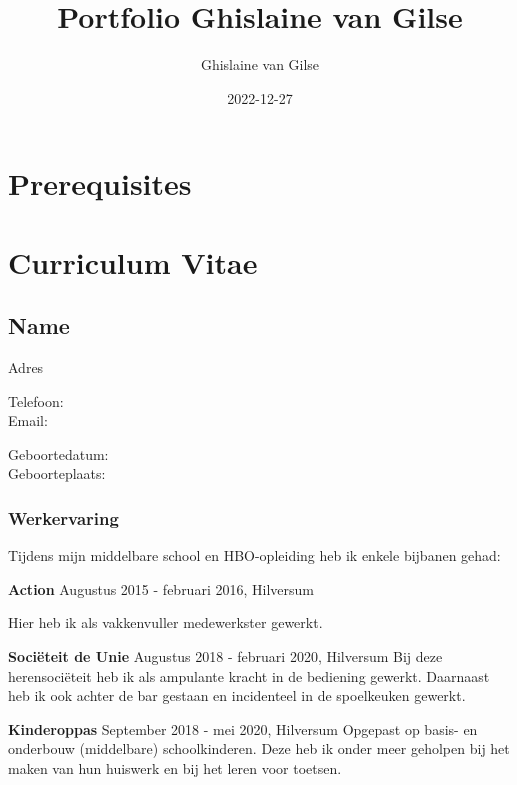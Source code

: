 \documentclass[
]{book}
\title{Portfolio Ghislaine van Gilse}
\author{Ghislaine van Gilse}
\date{2022-12-27}
\begin{document}
\maketitle

{
\setcounter{tocdepth}{1}
\tableofcontents
}
\hypertarget{prerequisites}{%
\chapter*{Prerequisites}\label{prerequisites}}

\hypertarget{curriculum-vitae}{%
\chapter*{Curriculum Vitae}\label{curriculum-vitae}}

\hypertarget{name}{%
\section*{Name}\label{name}}

Adres

Telefoon:\\
Email:

Geboortedatum:\\
Geboorteplaats:\\

\hypertarget{werkervaring}{%
\subsection*{Werkervaring}\label{werkervaring}}

Tijdens mijn middelbare school en HBO-opleiding heb ik enkele bijbanen gehad:

\textbf{Action}
Augustus 2015 - februari 2016, Hilversum

Hier heb ik als vakkenvuller medewerkster gewerkt.

\textbf{Sociëteit de Unie}
Augustus 2018 - februari 2020, Hilversum
Bij deze herensociëteit heb ik als ampulante kracht in de bediening gewerkt. Daarnaast heb ik ook achter de bar gestaan en incidenteel in de spoelkeuken gewerkt.

\textbf{Kinderoppas}
September 2018 - mei 2020, Hilversum
Opgepast op basis- en onderbouw (middelbare) schoolkinderen. Deze heb ik onder meer geholpen bij het maken van hun huiswerk en bij het leren voor toetsen.
\end{document}
